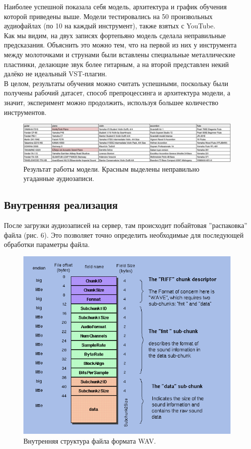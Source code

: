 \documentclass[14pt,a4paper]{article}
\begin{document}
Наиболее успешной показала себя модель, архитектура и график обучения которой приведены выше. Модели тестировались на 50 произвольных аудиофайлах (по 10 на каждый инструмент), также взятых с YouTube. \\

Как мы видим, на двух записях фортепьяно модель сделала неправильные предсказания. Объяснить это можно тем, что на первой из них у инструмента между молоточками и струнами были вставлены специальные металлические пластинки, делающие звук более гитарным, а на второй представлен некий далёко не идеальный VST-плагин. \\

В целом, результаты обучения можно считать успешными, поскольку были получены рабочий датасет, способ препроцессинга и архитектура модели, а значит, эксперимент можно продолжить, используя большее количество инструментов.

\begin{figure}[H]
\centering
\includegraphics[scale=0.37]{img/results.png}
\caption{Результат работы модели. Красным выделены неправильно угаданные аудиозаписи.}
\end{figure}

\subsection{Внутренняя реализация}

После загрузки аудиозаписей на сервер, там происходит побайтовая ''распаковка'' файла (рис. 6). Это позволяет точно определить необходимые для последующей обработки параметры файла.

\begin{figure}[H]
\centering
\includegraphics[scale=0.5]{img/wave_format.png}
\caption{Внутренняя структура файла формата WAV.}
\label{fig:wave_format}
\end{figure}
\end{document}

